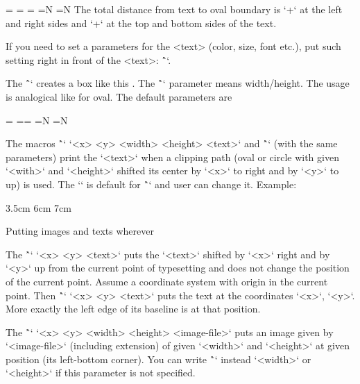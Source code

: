 {\begtt
\ovalparams={\roundness=2pt           %
             \fcolor=\Yellow          %
             \lcolor=\Red             %
             \lwidth=0.5bp            %
             \shadow=N                %
             \overlapmargins=N        %
             \hhkern=0pt \vvkern=0pt} %
\endtt
The total distance from text to oval boundary is `\hhkern+\roundness` at the left and right
sides and
`\vvkern+\roundness` at the top and bottom sides of the text.

If you need to set a parameters for the <text> (color, size, font etc.),
put such setting right in front of the <text>:
\^``.

\new
The \^`` creates a box like this .
The \^`\ratio` parameter means width/height. The usage is analogical like for oval.
The default parameters are

\begtt
\circleparams={ \fcolor=\Yellow \lcolor=\Red \lwidth=0.5bp
               \shadow=N \overlapmargins=N \hhkern=2pt \vvkern=2pt}
\endtt

\new
The macros \^`\clipinoval` `<x> <y> <width> <height> {<text>}`
and \^`\clipincircle` (with the same parameters)
print the `<text>` when a clipping path (oval or circle with given
`<with>` and `<height>` shifted its center by `<x>` to right and by `<y>` to up)
is used.
The `\roundness=5mm` is default for \^`\clipinoval` and user can change it.
Example:

\begtt
\clipincircle 3cm 3.5cm 6cm 7cm {\picw=6cm }
\endtt

\secc Putting images and texts wherever

\new
The \^`\puttext` `<x> <y> {<text>}` puts the `<text>` shifted by `<x>` right and by
`<y>` up from the current point of typesetting and does not change the
position of the current point. Assume a coordinate system with origin in the
current point. Then \^`\puttext` `<x> <y> {<text>}` puts the text at the
coordinates `<x>`, `<y>`. More exactly the left edge of its baseline is at that
position.

\new
The \^`\putpic` `<x> <y> <width> <height> {<image-file>}` puts an image
given by `<image-file>` (including extension) of given
`<width>` and `<height>` at given position (its left-bottom corner).
You can write \^`\nospec` instead `<width>` or `<height>` if this parameter
is not specified.

}
